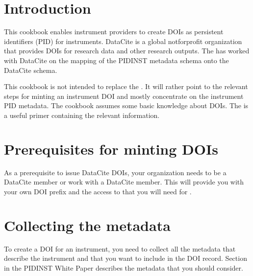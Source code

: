 \documentclass[a4paper,10pt,english]{sphinxmanual}
\begin{document}
\section{Introduction}
\label{\detokenize{datacite-cookbook/intro:introduction}}\label{\detokenize{datacite-cookbook/intro::doc}}
\sphinxAtStartPar
This cookbook enables instrument providers to create  DOIs
as persistent identifiers (PID) for instruments.  DataCite is a global
not\sphinxhyphen{}for\sphinxhyphen{}profit organization that provides DOIs for research data and
other research outputs.  The  has worked with DataCite on the mapping of
the PIDINST metadata schema onto the DataCite schema.

\sphinxAtStartPar
This cookbook is not intended to replace the .  It will rather point to the relevant steps for
minting an instrument DOI and mostly concentrate on the instrument PID
metadata.  The cookbook assumes some basic knowledge about DOIs.  The
 is a useful primer containing
the relevant information.


\section{Prerequisites for minting DOIs}
\label{\detokenize{datacite-cookbook/prereq:prerequisites-for-minting-dois}}\label{\detokenize{datacite-cookbook/prereq::doc}}
\sphinxAtStartPar
As a prerequisite to issue DataCite DOIs, your organization needs to
be a DataCite member or work with a DataCite member.  This will
provide you with your own DOI prefix and the access to
 that you will need for
{\hyperref[\detokenize{datacite-cookbook/minting:datacite-cookbook-minting}]{}}.


\section{Collecting the metadata}
\label{\detokenize{datacite-cookbook/metadata:collecting-the-metadata}}\label{\detokenize{datacite-cookbook/metadata::doc}}
\sphinxAtStartPar
To create a DOI for an instrument, you need to collect all the
metadata that describe the instrument and that you want to include in
the DOI record.  Section {\hyperref[\detokenize{white-paper/metadata-schema:pidinst-metadata-schema}]{}} in the PIDINST
White Paper describes the metadata that you should consider.
\end{document}

